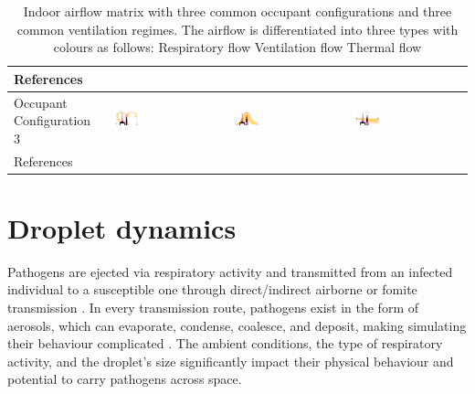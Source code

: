 \documentclass[preprint,12pt]{elsarticle}
\DeclareRobustCommand{\legendsquare}[1]{%
  \tikz[baseline=(a.south)]{\node[#1, inner sep=.8ex, outer sep=0] (a) {};}%
  }
\begin{document}
\begin{table}[h!]
\begin{tabular}{|m{2.5cm}|m{3.5cm}|m{3.5cm}|m{3.5cm}|}
    \hline
    References & \cite{he2011cfd,yan2021transmission,mirzaie2021covid,li2021effects,shao2021risk,qin2023transmission,xu2023cfd} & \cite{he2011cfd,lu2022ventilation,jain2023numerical} & \cite{ho2021modeling,duill2021impact,ren2022practical,lu2022ventilation} \\
    \hline
    Occupant Configuration 3 &\includegraphics[clip,trim={0 2cm 0 2cm},width=0.25\textwidth]{Airflow/mat3.jpeg}& \includegraphics[clip,trim={0 2cm 0 2cm},width=0.25\textwidth]{Airflow/mat6.jpeg}& \includegraphics[clip,trim={0 2cm 0 2cm},width=0.25\textwidth]{Airflow/mat9.jpeg} \\
    \hline
    References & \cite{hang2014influence,romano2015numerical,liu2020full,lu2020reducing,zhou2021experimental,guo2022visualization,liu2023estimating} & \cite{zhou2021experimental,villafruela2019assessment,lu2020reducing} & \cite{jiang2009investigating,lu2020reducing} \\
    \hline
    \end{tabular}
    \caption{Indoor airflow matrix with three common occupant configurations and three common ventilation regimes. The airflow is differentiated into three types with colours as follows: \legendsquare{fill=resp} Respiratory flow \legendsquare{fill=vent} Ventilation flow \legendsquare{fill=therm} Thermal flow }
    \label{tab:mat}
\end{table}

\section{Droplet dynamics}

Pathogens are ejected via respiratory activity and transmitted from an infected individual to a susceptible one through direct/indirect airborne or fomite transmission \cite{leung2021transmissibility}. In every transmission route, pathogens exist in the form of aerosols, which can evaporate, condense, coalesce, and deposit, making simulating their behaviour complicated \cite{rosti2020fluid,zhou2021dynamical}. The ambient conditions, the type of respiratory activity, and the droplet's size significantly impact their physical behaviour and potential to carry pathogens across space.
\end{document}
